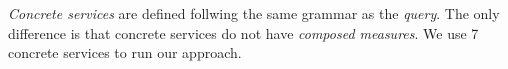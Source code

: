 \textit{Concrete services} are defined follwing the same grammar as the
\textit{query}. The only difference is that concrete services do not have
\textit{composed measures}. We use 7 concrete services to run our approach.

